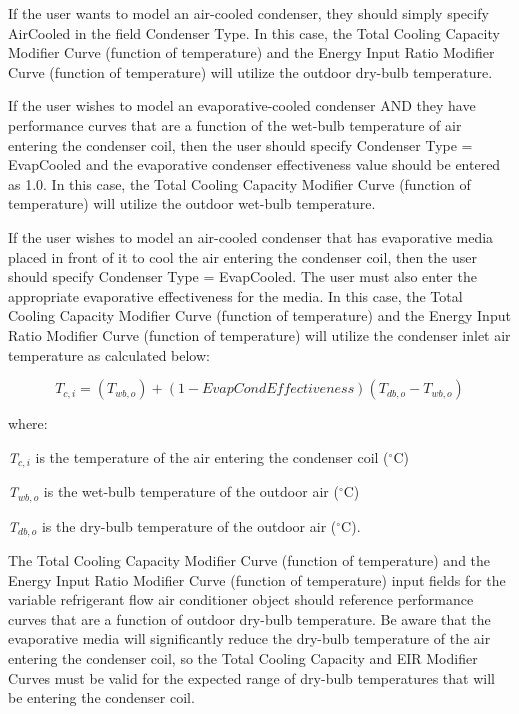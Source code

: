 If the user wants to model an air-cooled condenser, they should simply specify AirCooled in the field Condenser Type. In this case, the Total Cooling Capacity Modifier Curve (function of temperature) and the Energy Input Ratio Modifier Curve (function of temperature) will utilize the outdoor dry-bulb temperature.

If the user wishes to model an evaporative-cooled condenser AND they have performance curves that are a function of the wet-bulb temperature of air entering the condenser coil, then the user should specify Condenser Type = EvapCooled and the evaporative condenser effectiveness value should be entered as 1.0. In this case, the Total Cooling Capacity Modifier Curve (function of temperature) will utilize the outdoor wet-bulb temperature.

If the user wishes to model an air-cooled condenser that has evaporative media placed in front of it to cool the air entering the condenser coil, then the user should specify Condenser Type = EvapCooled. The user must also enter the appropriate evaporative effectiveness for the media. In this case, the Total Cooling Capacity Modifier Curve (function of temperature) and the Energy Input Ratio Modifier Curve (function of temperature) will utilize the condenser inlet air temperature as calculated below:

\begin{equation}
{T_{c,i}} = \left( {{T_{wb,o}}} \right) + \left( {1 - EvapCondEffectiveness} \right)\left( {{T_{db,o}} - {T_{wb,o}}} \right)
\end{equation}

where:

\emph{T\(_{c,i}\)} is the temperature of the air entering the condenser coil (\(^{\circ}\)C)

\emph{T\(_{wb,o}\)} is the wet-bulb temperature of the outdoor air (\(^{\circ}\)C)

\emph{T\(_{db,o}\)} is the dry-bulb temperature of the outdoor air (\(^{\circ}\)C).

The Total Cooling Capacity Modifier Curve (function of temperature) and the Energy Input Ratio Modifier Curve (function of temperature) input fields for the variable refrigerant flow air conditioner object should reference performance curves that are a function of outdoor dry-bulb temperature. Be aware that the evaporative media will significantly reduce the dry-bulb temperature of the air entering the condenser coil, so the Total Cooling Capacity and EIR Modifier Curves must be valid for the expected range of dry-bulb temperatures that will be entering the condenser coil.

